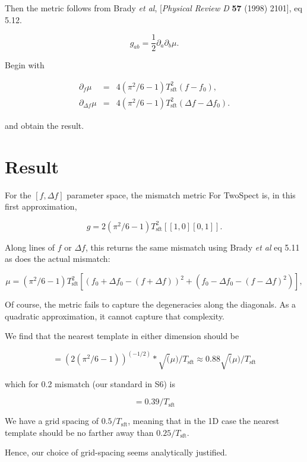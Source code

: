 \documentclass{article}
\begin{document}
\noindent Then the metric follows from
Brady \textit{et al}, [\textit{Physical Review D} \textbf{57} (1998) 2101], eq 5.12.

\begin{equation}
g_{ab} = \frac{1}{2} \partial_a \partial_b \mu.
\end{equation}

\noindent Begin with

\begin{eqnarray}
\partial_f \mu &=& 4(\pi^2/6 -1) T_\mathrm{sft}^2 (f-f_0),\\
\partial_{\Delta f} \mu &=& 4(\pi^2/6-1) T_\mathrm{sft}^2 (\Delta f - \Delta f_0).
\end{eqnarray}

\noindent and obtain the result.

\section{Result}

For the $[f, \Delta f]$ parameter space, the mismatch metric For TwoSpect is, in this first approximation,

\begin{equation}
  g = 2(\pi^2/6 - 1) T_\mathrm{sft}^2  [[1, 0][0, 1]].
\end{equation}

Along lines of $f$ or $\Delta f$, this returns
the same mismatch using Brady \textit{et al} eq 5.11 as does the actual mismatch:

\begin{equation}
\mu = (\pi^2/6 -1) T_\mathrm{sft}^2 
        [(f_0 + \Delta f_0 - (f + \Delta f))^2 + (f_0 - \Delta f_0 - (f - \Delta f)^2) ],
\end{equation}

Of course, the metric
fails to capture the degeneracies along the diagonals.
As a quadratic approximation, it cannot capture that complexity.

We find that the nearest template in either dimension should be

\begin{equation}
[f-f0] = (2 (\pi^2/6 - 1))^(-1/2) * \sqrt(\mu) / T_\mathrm{sft}
       \approx 0.88 \sqrt(\mu) / T_\mathrm{sft}
\end{equation}

\noindent
which for 0.2 mismatch (our standard in S6) is

\begin{equation}
[f-f0] = 0.39/T_\mathrm{sft}
\end{equation}

We have a grid spacing of $0.5/T_\mathrm{sft}$, meaning that in the 1D case the
nearest template should be no farther away than $0.25/T_\mathrm{sft}$.

Hence, our choice of grid-spacing seems analytically justified.
\end{document}
